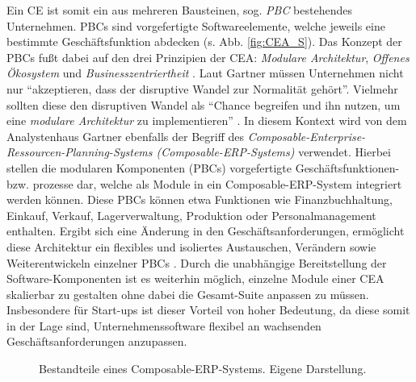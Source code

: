 Ein CE ist somit ein aus mehreren Bausteinen, sog. \textit{\ac{PBC}} bestehendes Unternehmen. PBCs sind vorgefertigte Softwareelemente, welche jeweils eine bestimmte Geschäftsfunktion abdecken (s. Abb. \ref{fig:CEA_S}). Das Konzept der PBCs fußt dabei auf den drei Prinzipien der CEA: \textit{Modulare Architektur}, \textit{Offenes Ökosystem} und \textit{Businesszentriertheit} \cite{.20230313}. Laut Gartner müssen Unternehmen nicht nur \enquote{akzeptieren, dass der disruptive Wandel zur Normalität gehört}. Vielmehr sollten diese den disruptiven Wandel als \enquote{Chance begreifen und ihn nutzen, um eine \textit{modulare Architektur} zu implementieren} \cite{.20230313}. In diesem Kontext wird von dem Analystenhaus Gartner ebenfalls der Begriff des \textit{Composable-Enterprise-Ressourcen-Planning-Systems (Composable-\acs{ERP}-Systems)} verwendet. Hierbei stellen die modularen Komponenten (PBCs) vorgefertigte Geschäftsfunktionen- bzw. prozesse dar, welche als Module in ein Composable-ERP-System integriert werden können. Diese PBCs können etwa Funktionen wie Finanzbuchhaltung, Einkauf, Verkauf, Lagerverwaltung, Produktion oder Personalmanagement enthalten. Ergibt sich eine Änderung in den Geschäftsanforderungen, ermöglicht diese Architektur ein flexibles und isoliertes Austauschen, Verändern sowie Weiterentwickeln einzelner PBCs \cite[315]{Chang.1019202010232020}. Durch die unabhängige Bereitstellung der Software-Komponenten ist es weiterhin möglich, einzelne Module einer CEA skalierbar zu gestalten ohne dabei die Gesamt-Suite anpassen zu müssen. Insbesondere für Start-ups ist dieser Vorteil von hoher Bedeutung, da diese somit in der Lage sind, Unternehmenssoftware flexibel an wachsenden Geschäftsanforderungen anzupassen.  
\begin{center}
	\begin{figure}[H]
		\centering
		\caption[Bestandteile eines Composable-ERP-Systems]{Bestandteile eines Composable-ERP-Systems. Eigene Darstellung.}
		\label{fig:CERP}
	\end{figure}	
\end{center}
\vspace*{-15mm}
